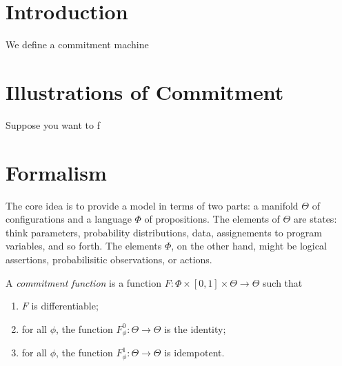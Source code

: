 \documentclass{article}
\begin{document}
\section{Introduction}

We define a commitment machine



\section{Illustrations of Commitment}

\begin{example}
    Suppose you want to f
\end{example}


\section{Formalism}
The core idea is to provide a model in terms of two parts: a manifold $\Theta$
of configurations and a language $\Phi$ of propositions.
The elements of $\Theta$ are states: think parameters, probability distributions, data, assignements to program variables, and so forth.
The elements $\Phi$, on the other hand, might be logical assertions, probabilisitic observations, or actions.

\begin{defn}
    A \emph{commitment function} is a function
    \(
        F: \Phi \times [0,1] \times \Theta \to \Theta
    \)
    such that
    \begin{enumerate}[nosep,label={CF\arabic*.}]
        \item $F$ is differentiable;
        \item for all $\phi$, the function $F^0_\phi : \Theta \to \Theta$ is the identity;
        \item for all $\phi$, the function $F^1_\phi : \Theta \to \Theta$ is idempotent.
    \end{enumerate}
\end{defn}
\end{document}
